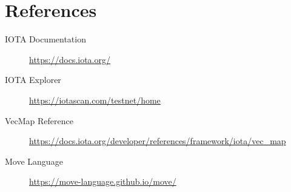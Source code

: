 \documentclass[12pt,a4paper]{article}
\begin{document}
\section*{References}

\begin{description}
    \item[IOTA Documentation] \url{https://docs.iota.org/}
    \item[IOTA Explorer] \url{https://iotascan.com/testnet/home}
    \item[VecMap Reference] \url{https://docs.iota.org/developer/references/framework/iota/vec_map}
    \item[Move Language] \url{https://move-language.github.io/move/}
\end{description}
\end{document}
